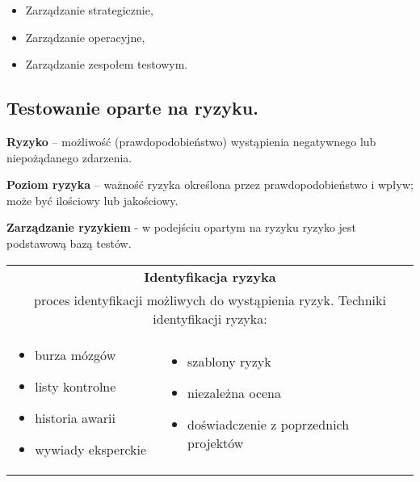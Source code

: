 \documentclass[../main.tex]{subfiles}
\begin{document}
    \begin{itemize}
        \item Zarządzanie strategicznie,
        \item Zarządzanie operacyjne,
        \item Zarządzanie zespołem testowym.
    \end{itemize}

    \subsection{Testowanie oparte na ryzyku.}

    \textbf{Ryzyko} – możliwość (prawdopodobieństwo) wystąpienia negatywnego lub niepożądanego zdarzenia.

    \textbf{Poziom ryzyka} – ważność ryzyka określona przez prawdopodobieństwo i wpływ; może być ilościowy lub
    jakościowy.

    \textbf{Zarządzanie ryzykiem} - w podejściu opartym na ryzyku ryzyko jest podstawową bazą testów.

    \begin{table}[H]
        \begin{center}
            \begin{tabular}{| p{8cm}  p{8cm} |}
                \hline
                \multicolumn{2}{|c|}{\textbf{Identyfikacja ryzyka}}\\
                \multicolumn{2}{|c|}{proces identyfikacji możliwych do wystąpienia ryzyk. Techniki identyfikacji
                ryzyka:}\\
                \hline
                \begin{itemize}
                    \item burza mózgów
                    \item listy kontrolne
                    \item historia awarii
                    \item wywiady eksperckie
                \end{itemize}
                &
                \begin{itemize}
                    \item szablony ryzyk
                    \item niezależna ocena
                    \item doświadczenie z poprzednich projektów
                \end{itemize}\\
                \hline
            \end{tabular}
        \end{center}
    \end{table}
\end{document}
